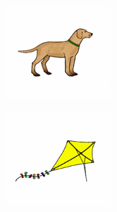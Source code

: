\begin{frame}
{		\begin{backgroundblock}{55mm}{22mm}		
			\includegraphics[scale=.4]{gfx/073} 
		\end{backgroundblock}
		
		\begin{backgroundblock}{90mm}{52mm}		
			\includegraphics[scale=.4]{gfx/129}
		\end{backgroundblock}
	}
	
	
	
	
	
\end{frame}


